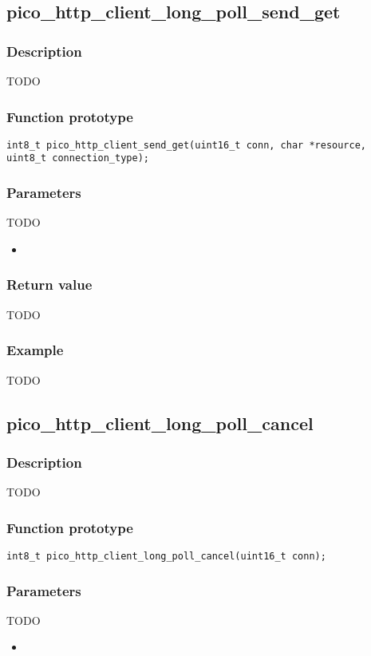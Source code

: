 \subsection{pico\_http\_client\_long\_poll\_send\_get}

\subsubsection*{Description}
TODO

\subsubsection*{Function prototype}
\texttt{int8\_t pico\_http\_client\_send\_get(uint16\_t conn, char *resource, uint8\_t connection\_type);}

\subsubsection*{Parameters}
TODO
\begin{itemize}[noitemsep]
\item \texttt{}
\end{itemize}
\subsubsection*{Return value}
TODO
\subsubsection*{Example}
TODO


\subsection{pico\_http\_client\_long\_poll\_cancel}

\subsubsection*{Description}
TODO

\subsubsection*{Function prototype}
\texttt{int8\_t pico\_http\_client\_long\_poll\_cancel(uint16\_t conn);}

\subsubsection*{Parameters}
TODO
\begin{itemize}[noitemsep]
\item \texttt{}
\end{itemize}
